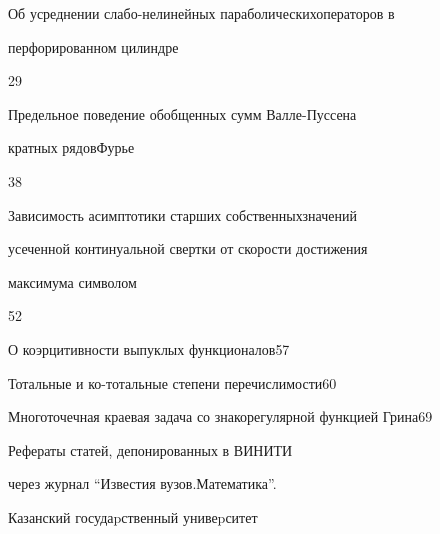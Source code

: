 {Об усреднении слабо-нелинейных параболических\newline операторов в


перфорированном цилиндре}{29}




{Предельное поведение обобщенных сумм Валле-Пуссена


кратных рядов\newline Фурье}{38}




{Зависимость асимптотики старших собственных\newline значений


усеченной континуальной свертки от скорости достижения 


максимума символом}{52}




{О коэрцитивности выпуклых функционалов}{57}




{Тотальные и ко-тотальные степени перечислимости}{60}




{Многоточечная краевая задача со знакорегулярной функцией Грина}{69}


\medskip





\noindent{}Рефераты статей, депонированных в ВИНИТИ


через журнал ``Известия вузов.\newline Математика''.














\vfill


\noindent\raisebox{2pt}{\copyright} Казанский госудаpственный унивеpситет






